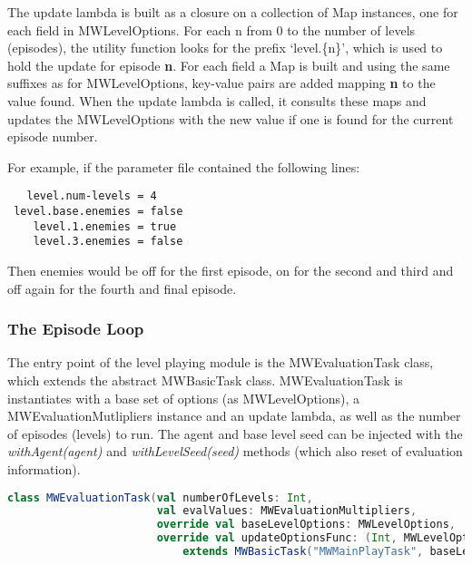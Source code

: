 The update lambda is built as a closure on a collection of Map instances, one for each field in MWLevelOptions. For each {\ttfamily n} from 0 to the number of levels (episodes), the utility function looks for the prefix `{\ttfamily level.\{n\}}', which is used to hold the update for episode \textbf{n}. For each field a Map is built and using the same suffixes as for MWLevelOptions, key-value pairs are added mapping \textbf{n} to the value found. When the update lambda is called, it consults these maps and updates the MWLevelOptions with the new value if one is found for the current episode number.

For example, if the parameter file contained the following lines:

\begin{minipage}{0.9\linewidth}
\centering
\begin{lstlisting}
   level.num-levels = 4
 level.base.enemies = false
    level.1.enemies = true
    level.3.enemies = false
\end{lstlisting}
\end{minipage}

Then enemies would be off for the first episode, on for the second and third and off again for the fourth and final episode.

\subsubsection{The Episode Loop}

The entry point of the level playing module is the MWEvaluationTask class, which extends the abstract MWBasicTask class. MWEvaluationTask is instantiates with a base set of options (as MWLevelOptions), a MWEvaluationMutlipliers instance and an update lambda, as well as the number of episodes (levels) to run. The agent and base level seed can be injected with the \emph{withAgent(agent)} and \emph{withLevelSeed(seed)} methods (which also reset of evaluation information).

\begin{minipage}{0.9\linewidth}
\centering
\begin{lstlisting}[language=scala]
class MWEvaluationTask(val numberOfLevels: Int, 
                       val evalValues: MWEvaluationMultipliers, 
                       override val baseLevelOptions: MWLevelOptions, 
                       override val updateOptionsFunc: (Int, MWLevelOptions) => MWLevelOptions)
                           extends MWBasicTask("MWMainPlayTask", baseLevelOptions, updateOptionsFunc, visualisation, args) with EvaluationTask {
\end{lstlisting}
\end{minipage}     
    
